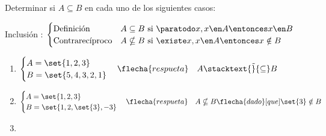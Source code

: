 \ejercicio
Determinar si $A \subseteq B$ en cada uno de los siguientes casos:

\separadorCorto

Inclusión :
$
	\begin{cases}
		\text{Definición}      & A \subseteq B \text{ si } \paratodo x, x \en A \entonces x \en B   \\
		\text{Contrarecíproco} & A \nsubseteq B \text{ si } \existe x, x \en A \entonces x \notin B
	\end{cases}
$
\begin{enumerate}[label=(\roman*)]
	\item $\begin{cases}
			      A = \set{1, 2, 3} \\
			      B = \set{5,4,3,2,1}
		      \end{cases}
		      \flecha{respueta} \quad
		      A \stacktext{\Tilde}{\subseteq} B$
	\item $\begin{cases}
			      A = \set{1, 2, 3} \\
			      B = \set{1,2,\set{3},-3}
		      \end{cases}
		      \flecha{respueta} \quad
		      A \nsubseteq B \flecha{dado}[que] \set{3} \notin B$
	\item
	      \def\tresiiiUno{
		      \begin{tikzpicture}[scale=0.8, baseline=0]
			      \draw[thick, <->,] (-3.5,0) -- (3.5,0);
			      \draw[fill=white] (2,0) circle (2pt);
			      \draw[fill=white] (3,0) circle (2pt);
			      \draw[fill=white] (-2,0) circle (2pt);
			      \draw[fill=white] (-3,0) circle (2pt);
			      \draw[-, magenta, ultra thick] (2,0) -- (3,0);
			      \draw[-, magenta, ultra thick] (-2,0) -- (-3,0);
			      \node at (2,-0.3) {2};
			      \node at (3,-0.3) {3};
			      \node at (-2,-0.3) {-2};
			      \node at (-3,-0.3) {-3};
		      \end{tikzpicture}
	      }


\end{enumerate}

